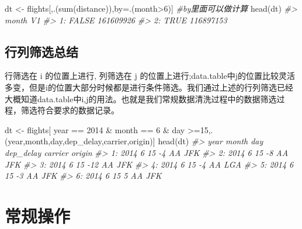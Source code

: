 \documentclass[
]{book}
\newenvironment{Shaded}{\begin{snugshade}}{\end{snugshade}}
\newcommand{\CommentTok}[1]{\textcolor[rgb]{0.56,0.35,0.01}{\textit{#1}}}
\newcommand{\DecValTok}[1]{\textcolor[rgb]{0.00,0.00,0.81}{#1}}
\newcommand{\FunctionTok}[1]{\textcolor[rgb]{0.00,0.00,0.00}{#1}}
\newcommand{\NormalTok}[1]{#1}
\newcommand{\OtherTok}[1]{\textcolor[rgb]{0.56,0.35,0.01}{#1}}
\newcommand{\SpecialCharTok}[1]{\textcolor[rgb]{0.00,0.00,0.00}{#1}}
\begin{document}
\begin{Shaded}
\begin{Highlighting}[]
\NormalTok{dt }\OtherTok{\textless{}{-}}\NormalTok{ flights[,.(}\FunctionTok{sum}\NormalTok{(distance)),by}\OtherTok{=}\NormalTok{.(month}\SpecialCharTok{\textgreater{}}\DecValTok{6}\NormalTok{)] }\CommentTok{\#by里面可以做计算}
\FunctionTok{head}\NormalTok{(dt)}
\CommentTok{\#\textgreater{}    month        V1}
\CommentTok{\#\textgreater{} 1: FALSE 161609926}
\CommentTok{\#\textgreater{} 2:  TRUE 116897153}
\end{Highlighting}
\end{Shaded}

\hypertarget{ux884cux5217ux7b5bux9009ux603bux7ed3}{%
\subsection{行列筛选总结}\label{ux884cux5217ux7b5bux9009ux603bux7ed3}}

行筛选在 i 的位置上进行, 列筛选在 j 的位置上进行;data.table中j的位置比较灵活多变，但是i的位置大部分时候都是进行条件筛选。我们通过上述的行列筛选已经大概知道data.table中i,j的用法。也就是我们常规数据清洗过程中的数据筛选过程，筛选符合要求的数据记录。

\begin{Shaded}
\begin{Highlighting}[]

\NormalTok{dt }\OtherTok{\textless{}{-}}\NormalTok{ flights[ year }\SpecialCharTok{==} \DecValTok{2014} \SpecialCharTok{\&}\NormalTok{ month }\SpecialCharTok{==} \DecValTok{6} \SpecialCharTok{\&}\NormalTok{ day }\SpecialCharTok{\textgreater{}=}\DecValTok{15}\NormalTok{,.(year,month,day,dep\_delay,carrier,origin)] }
\FunctionTok{head}\NormalTok{(dt)}
\CommentTok{\#\textgreater{}    year month day dep\_delay carrier origin}
\CommentTok{\#\textgreater{} 1: 2014     6  15        {-}4      AA    JFK}
\CommentTok{\#\textgreater{} 2: 2014     6  15        {-}8      AA    JFK}
\CommentTok{\#\textgreater{} 3: 2014     6  15       {-}12      AA    JFK}
\CommentTok{\#\textgreater{} 4: 2014     6  15        {-}4      AA    LGA}
\CommentTok{\#\textgreater{} 5: 2014     6  15        {-}3      AA    JFK}
\CommentTok{\#\textgreater{} 6: 2014     6  15         5      AA    JFK}
\end{Highlighting}
\end{Shaded}

\hypertarget{ux5e38ux89c4ux64cdux4f5c}{%
\section{常规操作}\label{ux5e38ux89c4ux64cdux4f5c}}
\end{document}
